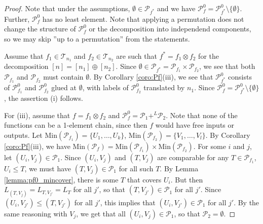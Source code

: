 \documentclass[12pt]{article}
\theoremstyle{definition}
\theoremstyle{remark}
\def\Te{\mathcal T}
\def\Pe{\mathcal P}
\begin{document}
\begin{proof} Note that under the assumptions, $\emptyset\in \Pe_{f^*}$ and we have
$\Pe_f^0=\Pe_{f^*}^0\setminus \{\emptyset\}$. Further, $\Pe_f^0$ has no least element. 
Note that applying a permutation does  not change the structure of $\Pe_f^0$ or the
decomposition into independend components, so we may skip ''up to a permutation'' from the
statements.

Assume that $f_1\in \Te_{n_1}$ and $f_2\in \Te_{n_2}$ are such that $f^*=f_1\otimes f_2$
for the decomposition $[n]=[n_1]\oplus [n_2]$. Since $\emptyset \in
\Pe_{f^*}=\Pe_{f_1}\times \Pe_{f_2}$, we see that both $\Pe_{f_1}$ and $\Pe_{f_2}$ must
contain $\emptyset$. By Corollary \ref{coro:Pf}(iii), we see that $\Pe_{f^*}^0$ consists
of $\Pe_{f_1}^0$ and $\Pe_{f_2}^0$ glued at $\emptyset$, with labels of $\Pe_{f_2}^0$
translated by $n_1$. Since $\Pe_f^0=\Pe^0_{f^*}\setminus \{\emptyset\}$, the assertion (i) 
follows.  

For (iii), assume that $f=f_1\otimes f_2$ and $\Pe_f^0=\Pe_1+^L\Pe_2$. Note that none of
the functions can be a 1-element chain, since then $f$ would have free inputs or outputs. Let
$\mathrm{Min}(\Pe_{f_1})=\{U_1,\dots,U_k\}$,  $\mathrm{Min}(\Pe_{f_2})=\{V_1,\dots,V_l\}$.
By Corollary \ref{coro:Pf}(iii), we have  $\mathrm{Min}(\Pe_{f})=\mathrm{Min}(\Pe_{f_1})\times \mathrm{Min}(\Pe_{f_2})$. 
For some $i$ and $j$, let $(U_i,V_j)\in \Pe_1$. Since $(U_i,V_j)$ and $(T,V_j)$ are
comparable for any $T\in \Pe_{f_1}$, $U_i\le T$, we must have $(T,V_j)\in \Pe_1$ for all
such $T$. By Lemma \ref{lemma:pf0_mincover}, there is some $T$ that covers $U_i$. 
But then $L_{(T,V_j)}=L_{T,V_{j'}}=L_T$ for all $j'$, so that $(T,V_{j'})\in \Pe_1$
for all $j'$. Since $(U_i,V_{j'})\le (T,V_{j'})$ for all $j'$, this implies that $(U_i,
V_{j'})\in \Pe_1$ for all $j'$. By the same reasoning with $V_j$, we get that all $(U_i,
V_j)\in \Pe_1$, so that $\Pe_2=\emptyset$. 



\end{proof}
\end{document}

